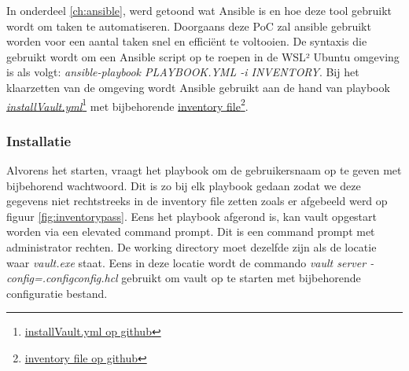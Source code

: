In onderdeel \ref{ch:ansible}, werd getoond wat Ansible is en hoe deze tool gebruikt wordt om taken te automatiseren. Doorgaans deze PoC zal ansible gebruikt worden voor een aantal taken snel en efficiënt te voltooien. De syntaxis die gebruikt wordt om een Ansible script op te roepen in de WSL² Ubuntu omgeving is als volgt: \textit{ansible-playbook PLAYBOOK.YML -i INVENTORY}. Bij het klaarzetten van de omgeving wordt Ansible gebruikt aan de hand van playbook \href{https://github.com/Rayenasr/Secrets-management-thesis/blob/main/vault/installVault.yml}{\textit{installVault.yml}}\footnote{\href{https://github.com/Rayenasr/Secrets-management-thesis/blob/main/vault/installVault.yml}{installVault.yml op github}} met bijbehorende \href{https://github.com/Rayenasr/Secrets-management-thesis/blob/main/vault/inventory}{inventory file}\footnote{\href{https://github.com/Rayenasr/Secrets-management-thesis/blob/main/vault/inventory}{inventory file op github}}.


\subsubsection{Installatie}
Alvorens het starten, vraagt het playbook om de gebruikersnaam op te geven met bijbehorend wachtwoord. Dit is zo bij elk playbook gedaan zodat we deze gegevens niet rechtstreeks in de inventory file zetten zoals er afgebeeld werd op figuur \ref{fig:inventorypass}. Eens het playbook afgerond is, kan vault opgestart worden via een elevated command prompt. Dit is een command prompt met administrator rechten. De working directory moet dezelfde zijn als de locatie waar \textit{vault.exe} staat. Eens in deze locatie wordt de commando \textit{vault server -config=.configconfig.hcl} gebruikt om vault op te starten met bijbehorende configuratie bestand. 

